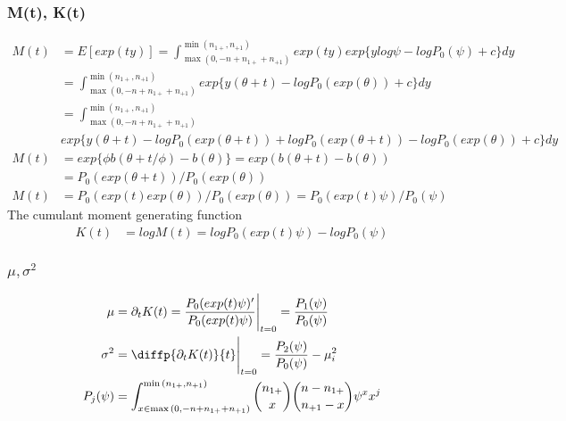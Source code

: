 \subsubsection{M(t), K(t)}
\begin{align*}
	M(t) &= E[exp(ty)] = \int_{ \max{(0, -n + n_{1+} + n_{+1})}}^{\min{(n_{1+}, n_{+1})}} exp(ty)exp\{ y log \psi - log P_0(\psi) + c \} dy\\
	&= \int_{ \max{(0, -n + n_{1+} + n_{+1})}}^{\min{(n_{1+}, n_{+1})}} exp\{ y (\theta + t) - log P_0(exp(\theta)) + c \} dy\\
	&=\int_{ \max{(0, -n + n_{1+} + n_{+1})}}^{\min{(n_{1+}, n_{+1})}}\\
	& exp\{ y (\theta + t) - log P_0(exp(\theta + t)) + log P_0(exp(\theta + t)) - log P_0(exp(\theta))+ c \} dy \\
	M(t) &=exp\{\phi b(\theta + t/\phi) - b(\theta)\}= exp(b(\theta + t) - b(\theta))\\
	&= P_0(exp(\theta + t))/ P_0(exp(\theta))\\
	M(t) &= P_0(exp(t)exp(\theta)) /P_0(exp(\theta)) =  P_0(exp(t)\psi) /P_0(\psi)
\end{align*}
The cumulant moment generating function
\begin{align*}
	K(t) &= log M(t) = log P_0(exp(t)\psi) - log P_0(\psi)
\end{align*}

\subsubsection{$\mu, \sigma^2$}

\begin{align*}
	\mu &= \partial_t K(t) = \frac{P_0(exp(t)\psi)'}{P_0(exp(t)\psi)} \Bigg{|}_{t=0} = \frac{P_1(\psi)}{P_0(\psi)}\\
	\sigma^2 &= \diffp{{\partial_t K(t)}}{t} \Bigg{|}_{t=0}
	 = \frac{P_2(\psi)}{P_0(\psi)} - \mu_i^2 \\
	P_{j}(\psi) &= \int_{x \in \max{(0, -n + n_{1+} + n_{+1})}}^{\min{(n_{1+}, n_{+1})}} {n_{1+} \choose x}{n-n_{1+} \choose n_{+1}-x} \psi^x x^j
\end{align*}


